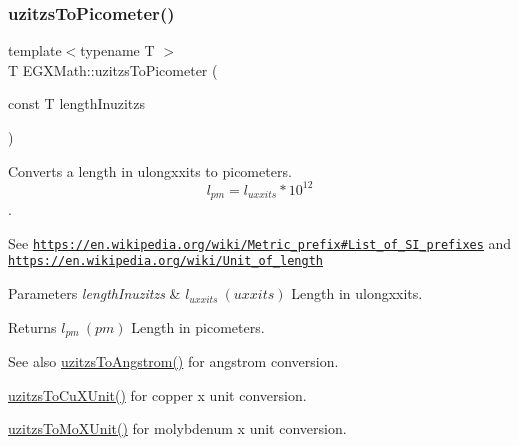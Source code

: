 \subsubsection{\texorpdfstring{uzitzs\+To\+Picometer()}{uzitzsToPicometer()}}
{\footnotesize\ttfamily template$<$typename T $>$ \\
T E\+G\+X\+Math\+::uzitzs\+To\+Picometer (\begin{DoxyParamCaption}\item[{const T}]{length\+Inuzitzs }\end{DoxyParamCaption})}



Converts a length in ulongxxits to picometers. \[ l_{pm}=l_{uxxits} * 10^{12} \]. 

See \href{https://en.wikipedia.org/wiki/Metric_prefix#List_of_SI_prefixes}{\tt https\+://en.\+wikipedia.\+org/wiki/\+Metric\+\_\+prefix\#\+List\+\_\+of\+\_\+\+S\+I\+\_\+prefixes} and \href{https://en.wikipedia.org/wiki/Unit_of_length}{\tt https\+://en.\+wikipedia.\+org/wiki/\+Unit\+\_\+of\+\_\+length} 
\begin{DoxyParams}{Parameters}
{\em length\+Inuzitzs} & $ l_{uxxits}\ (uxxits)$ Length in ulongxxits. \\
\hline
\end{DoxyParams}
\begin{DoxyReturn}{Returns}
$ l_{pm}\ (pm)$ Length in picometers. 
\end{DoxyReturn}
\begin{DoxySeeAlso}{See also}
\mbox{\hyperlink{group___e_g_x_math-_conversions-_length_conversions-uzitzs-_non-_s_i_gaaaecee65b1db5abcc71e18526e7073eb}{uzitzs\+To\+Angstrom()}} for angstrom conversion. 

\mbox{\hyperlink{group___e_g_x_math-_conversions-_length_conversions-uzitzs-_non-_s_i_gab25470e41b88c41d4bf32622baa6c472}{uzitzs\+To\+Cu\+X\+Unit()}} for copper x unit conversion. 

\mbox{\hyperlink{group___e_g_x_math-_conversions-_length_conversions-uzitzs-_non-_s_i_ga64b556911b0bb06cf315aa02f5e2d379}{uzitzs\+To\+Mo\+X\+Unit()}} for molybdenum x unit conversion. 
\end{DoxySeeAlso}
\mbox{\label{group___e_g_x_math-_conversions-_length_conversions-uzitzs-_s_i_gaed1a457a06ea3b69a4c63414b08b03a3}} 
